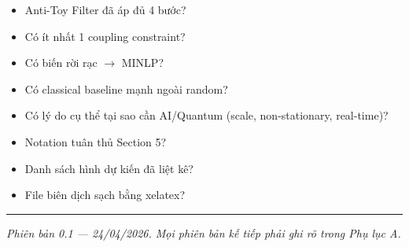 \documentclass[11pt,a4paper]{article}
\begin{document}
\begin{itemize}
  \item[$\square$] Anti-Toy Filter đã áp đủ 4 bước?
  \item[$\square$] Có ít nhất 1 coupling constraint?
  \item[$\square$] Có biến rời rạc $\rightarrow$ MINLP?
  \item[$\square$] Có classical baseline mạnh ngoài random?
  \item[$\square$] Có lý do cụ thể tại sao cần AI/Quantum (scale, non-stationary, real-time)?
  \item[$\square$] Notation tuân thủ Section 5?
  \item[$\square$] Danh sách hình dự kiến đã liệt kê?
  \item[$\square$] File biên dịch sạch bằng xelatex?
\end{itemize}

\vspace{0.4cm}
\hrule
\vspace{0.3cm}
\textit{\small Phiên bản 0.1 --- 24/04/2026. Mọi phiên bản kế tiếp phải ghi rõ trong Phụ lục A.}
\end{document}
